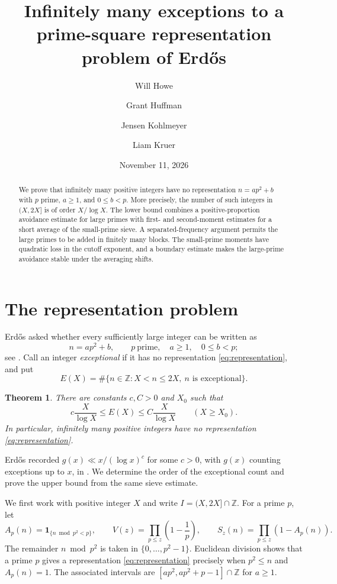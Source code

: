 \documentclass[11pt,reqno]{amsart}
\title[Exceptions to an Erd\H{o}s representation problem]{Infinitely many exceptions to a prime-square representation problem of Erd\H{o}s}
\author[W. Howe]{Will Howe}
\author[G. Huffman]{Grant Huffman}
\author[J. Kohlmeyer]{Jensen Kohlmeyer}
\author[L. Kruer]{Liam Kruer}
\date{November 11, 2026}
\newtheorem{theorem}{Theorem}[section]
\theoremstyle{remark}
\numberwithin{equation}{section}
\newcommand{\Z}{\mathbb Z}
\newcommand{\ind}{\mathbf 1}
\begin{document}
\begin{abstract}
We prove that infinitely many positive integers have no representation
$n=ap^2+b$ with $p$ prime, $a\geq1$, and $0\leq b<p$.
More precisely, the number of such integers in $(X,2X]$ is of order
$X/\log X$. The lower bound combines a positive-proportion avoidance
estimate for large primes with first- and second-moment estimates for
a short average of the small-prime sieve. A separated-frequency
argument permits the large primes to be added in finitely many blocks.
The small-prime moments have quadratic loss in the cutoff exponent,
and a boundary estimate makes the large-prime avoidance stable under
the averaging shifts.
\end{abstract}
\maketitle

\section{The representation problem}

Erd\H{o}s asked whether every sufficiently large integer can be written as
\begin{equation}\label{eq:representation}
 n=ap^2+b,\qquad p\ \text{prime},\quad a\geq1,\quad 0\leq b<p;
\end{equation}
see \cite[p.~68, problem~3]{Erdos}. Call an integer \emph{exceptional}
if it has no representation \eqref{eq:representation}, and put
\[
 E(X)=\#\{n\in\Z:X<n\leq2X,\ n\text{ is exceptional}\}.
\]

\begin{theorem}\label{thm:main}
There are constants $c,C>0$ and $X_0$ such that
\begin{equation}\label{eq:main}
 c\frac{X}{\log X}\leq E(X)\leq C\frac{X}{\log X}
 \qquad(X\geq X_0).
\end{equation}
In particular, infinitely many positive integers have no representation
\eqref{eq:representation}.
\end{theorem}

Erd\H{o}s recorded $g(x)\ll x/(\log x)^c$ for some $c>0$, with
$g(x)$ counting exceptions up to $x$, in \cite[p.~68]{Erdos}.
We determine the order of the exceptional count and prove the upper
bound from the same sieve estimate.

We first work with positive integer $X$ and write
$I=(X,2X]\cap\Z$. For a prime $p$, let
\[
 A_p(n)=\ind_{\{n\bmod p^2<p\}},\qquad
 V(z)=\prod_{p\leq z}\left(1-\frac1p\right),\qquad
 S_z(n)=\prod_{p\leq z}(1-A_p(n)).
\]
The remainder $n\bmod p^2$ is taken in $\{0,\ldots,p^2-1\}$.
Euclidean division shows that a prime $p$ gives a representation
\eqref{eq:representation} precisely when $p^2\leq n$ and $A_p(n)=1$.
The associated intervals are $[ap^2,ap^2+p-1]\cap\Z$ for $a\geq1$.
\end{document}
